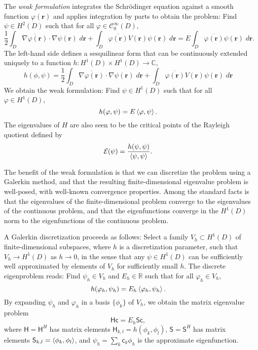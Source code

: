 \documentclass[12pt]{article}
\newcommand{\RR}{\mathbb{R}}
\newcommand{\CC}{\mathbb{C}}
\begin{document}
The \emph{weak formulation} integrates the Schrödinger equation against a smooth function $\varphi(\mathbf{r})$ and applies integration by parts to obtain the problem: Find $\psi \in H^2(D)$ such that for all $\varphi \in \mathcal{C}_0^\infty(D)$,
\begin{equation}
    \frac{1}{2} \int_D \overline{\nabla \varphi(\mathbf{r})} \cdot \nabla \psi(\mathbf{r}) \; d\mathbf{r} + \int_D \overline{\varphi(\mathbf{r})} V(\mathbf{r}) \psi(\mathbf{r})  \; d\mathbf{r} = E \int_D \overline{\varphi(\mathbf{r})} \psi(\mathbf{r}) \; d\mathbf{r}.
\end{equation}
The left-hand side defines a sesquilinear form that can be continuously extended uniquely to a function $h : H^1(D)\times H^1(D) \to \CC$,
\begin{equation}
    h(\phi,\psi) = \frac{1}{2} \int_D \overline{\nabla \varphi(\mathbf{r})} \cdot \nabla \psi(\mathbf{r}) \; d\mathbf{r} + \int_D \overline{\varphi(\mathbf{r})} V(\mathbf{r}) \psi(\mathbf{r})  \; d\mathbf{r} 
\end{equation}
We obtain the weak formulation: Find $\psi \in H^1(D)$ such that for all $\varphi \in H^1(D)$,
\begin{equation}
    h(\varphi,\psi) = E \braket{\varphi,\psi}.
\end{equation}
The eigenvalues of $H$ are also seen to be the critical points of the Rayleigh quotient defined by
\begin{equation}
    \mathcal{E}(\psi) = \frac{h(\psi,\psi)}{\braket{\psi,\psi}}.
\end{equation}

The benefit of the weak formulation is that we can discretize the problem using a Galerkin method, and that the resulting finite-dimensional eigenvalue problem is well-posed, with well-known convergence properties. Among the standard facts is that the eigenvalues of the finite-dimensional problem converge to the eigenvalues of the continuous problem, and that the eigenfunctions converge in the $H^1(D)$ norm to the eigenfunctions of the continuous problem.

A Galerkin discretization proceeds as follows: Select a family $V_h \subset H^1(D)$ of finite-dimensional subspaces, where $h$ is a discretization parameter, such that $V_h \to H^1(D)$ as $h\to 0$, in the sense that any $\psi \in H^1(D)$ can be sufficiently well approximated by elements of $V_h$ for sufficiently small $h$. The discrete eigenproblem reads: Find $\psi_h \in V_h$ and $E_h \in \RR$ such that for all $\varphi_h \in V_h$,
\begin{equation}
    h(\varphi_h,\psi_h) = E_h \braket{\varphi_h,\psi_h}.
\end{equation}
By expanding $\psi_h$ and $\varphi_h$ in a basis $\{\phi_k\}$ of $V_h$, we obtain the matrix eigenvalue problem
\begin{equation}
    \mathsf{H} \mathsf{c} = E_h \mathsf{S} \mathsf{c},
\end{equation}
where $\mathsf{H} = \mathsf{H}^H$ has matrix elements $\mathsf{H}_{k,l} = h(\phi_k,\phi_l)$, $\mathsf{S} = \mathsf{S}^H$ has matrix elements $\mathsf{S}_{k,l} = \braket{\phi_k,\phi_l}$, and $\psi_h = \sum_k \mathsf{c}_k \phi_h$ is the approximate eigenfunction.
\end{document}
